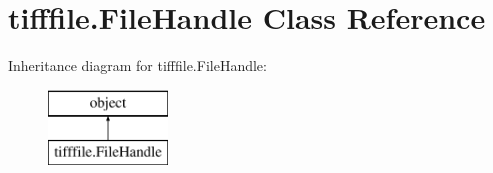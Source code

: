 \hypertarget{classtifffile_1_1_file_handle}{\section{tifffile.\-File\-Handle Class Reference}
\label{classtifffile_1_1_file_handle}
}
Inheritance diagram for tifffile.\-File\-Handle\-:\begin{figure}[H]
\begin{center}
\leavevmode
\includegraphics[height=2.000000cm]{classtifffile_1_1_file_handle}
\end{center}
\end{figure}
